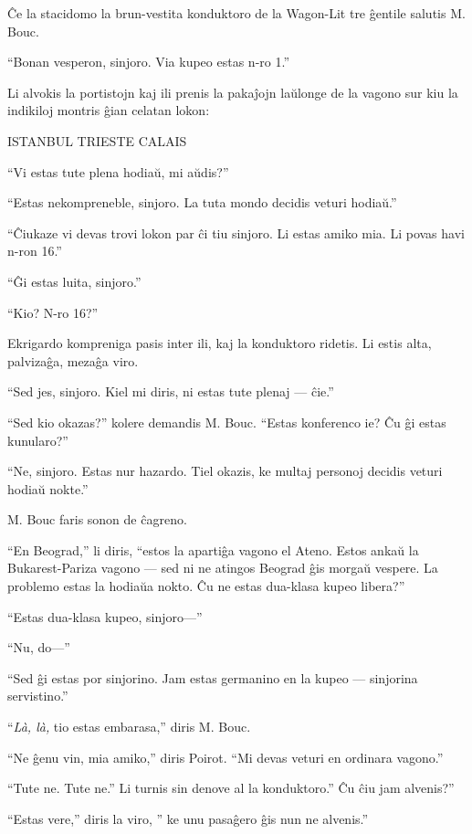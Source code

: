 Ĉe la stacidomo la brun-vestita konduktoro de la Wagon-Lit tre ĝentile salutis M. Bouc.

``Bonan vesperon, sinjoro. Via kupeo estas n-ro 1.''

Li alvokis la portistojn kaj ili prenis la pakaĵojn laŭlonge de la vagono sur kiu la indikiloj montris ĝian celatan lokon:

\begin{center}{ISTANBUL TRIESTE CALAIS\\}\end{center}

``Vi estas tute plena hodiaŭ, mi aŭdis?''

``Estas nekompreneble, sinjoro. La tuta mondo decidis veturi hodiaŭ.''

``Ĉiukaze vi devas trovi lokon par ĉi tiu sinjoro. Li estas amiko mia. Li povas havi n-ron 16.''

``Ĝi estas luita, sinjoro.''

``Kio? N-ro 16?''

Ekrigardo kompreniga pasis inter ili, kaj la konduktoro ridetis. Li estis alta, palvizaĝa, mezaĝa viro.

``Sed jes, sinjoro. Kiel mi diris, ni estas tute plenaj --- ĉie.''

``Sed kio okazas?'' kolere demandis M. Bouc. ``Estas konferenco ie? Ĉu ĝi estas kunularo?''

``Ne, sinjoro. Estas nur hazardo. Tiel okazis, ke multaj personoj decidis veturi hodiaŭ nokte.''

M. Bouc faris sonon de ĉagreno.

``En Beograd,'' li diris, ``estos la apartiĝa vagono el Ateno. Estos ankaŭ la Bukarest-Pariza vagono --- sed ni ne atingos Beograd ĝis morgaŭ vespere. La problemo estas la hodiaŭa nokto. Ĉu ne estas dua-klasa kupeo libera?''

``Estas dua-klasa kupeo, sinjoro---''

``Nu, do---''

``Sed ĝi estas por sinjorino. Jam estas germanino en la kupeo --- sinjorina servistino.''

``\emph{Là, là,} tio estas embarasa,'' diris M. Bouc.

``Ne ĝenu vin, mia amiko,'' diris Poirot. ``Mi devas veturi en ordinara vagono.''

``Tute ne. Tute ne.'' Li turnis sin denove al la konduktoro.'' Ĉu ĉiu jam alvenis?''

``Estas vere,'' diris la viro, '' ke unu pasaĝero ĝis nun ne alvenis.''

